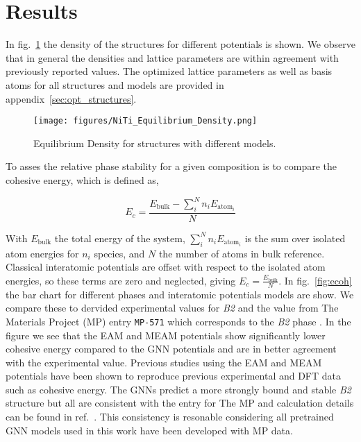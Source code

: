 \documentclass[preprint,colorlinks=true,linkcolor=black,citecolor=black]{elsarticle}
\begin{document}

\section{Results}
\label{sec:results}

In fig.~\ref{fig:opt_density} the density of the structures for
different potentials is shown. We observe that in general the
densities and lattice parameters are within agreement with previously
reported values. The optimized lattice parameters as well as basis
atoms for all structures and models are provided in appendix~\ref{sec:opt_structures}. \par

\begin{figure}[ht!]
	\label{fig:opt_density}
	\centering
	\texttt{[image: figures/NiTi\_Equilibrium\_Density.png]}
	\caption{Equilibrium Density for  structures with different models.}
\end{figure}

To asses the relative phase stability for a given composition is
to compare the cohesive energy, which is defined as,

\begin{equation}
	\label{eq:cohesive_energy}
	E_{c} = \frac{E_{\text{bulk}} - \sum_{i}^{N} n_i E_{\text{atom}_i}}{N}
\end{equation}

With $E_{\text{bulk}}$ the total energy of the system,
$\sum_i^N n_i E_{\text{atom}_i}$ is the sum over isolated atom
energies for $n_i$ species, and $N$ the number of atoms in bulk
reference. Classical interatomic potentials are offset with respect to
the isolated atom energies, so these terms are zero and neglected,
giving $E_{c} = \frac{E_{\text{bulk}}}{N}$. In fig.~\ref{fig:ecoh} the
bar chart for different phases and interatomic potentials models are
show. We compare these to dervided experimental values for
\textit{B2}\cite{Vandermause2024} and the value from The Materials
Project (MP) entry \texttt{MP-571} which corresponds to the
\textit{B2} phase \cite{MP--571}. In the figure we see that the EAM
and MEAM potentials show significantly lower cohesive energy compared
to the GNN potentials and are in better agreement with the
experimental value. Previous studies using the EAM and MEAM potentials
have been shown to reproduce previous experimental and DFT data
\cite{Haskins2016,Ko2015} such as cohesive energy. The GNNs predict a
more strongly bound and stable \textit{B2} structure but all are
consistent with the entry for The MP and calculation details can be
found in ref.~\cite{MP--571}. This consistency is resonable
considering all pretrained GNN models used in this work have been
developed with MP data. \par
\end{document}
